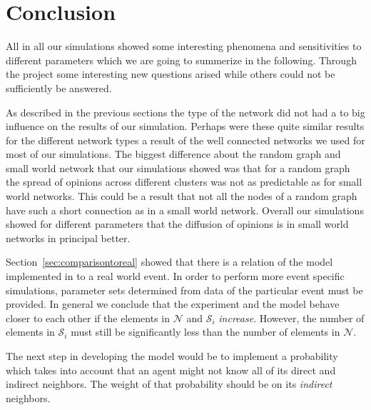 
\section{Conclusion}
\label{sec:conclusion}

All in all our simulations showed some interesting phenomena and sensitivities
to different parameters which we are going to summerize in the
following. Through the project some interesting new questions arised while
others could not be sufficiently be answered.

As described in the previous sections the type of the network did not had a to
big influence on the results of our simulation. Perhaps were these quite
similar results for the different network types a result of the well connected
networks we used for most of our simulations. The biggest difference about the
random graph and small world network that our simulations showed was that for a
random graph the spread of opinions across different clusters was not as
predictable as for small world networks. This could be a result that not all
the nodes of a random graph have such a short connection as in a small world
network. Overall our simulations showed for different parameters that the
diffusion of opinions is in small world networks in principal better.

Section~\ref{sec:comparisontoreal} showed that there is a relation of the model
implemented in \matlab to a real world event.  In order to perform more event
specific simulations, parameter sets determined from data of the particular
event must be provided.  In general we conclude that the experiment and the
model behave closer to each other if the elements in $\mathcal{N}$ and
$\mathcal{S}_i$ \emph{increase}.  However, the number of elements in
$\mathcal{S}_i$ must still be significantly less than the number of elements in
$\mathcal{N}$.

The next step in developing the model would be to implement a probability which
takes into account that an agent might not know all of its direct and indirect
neighbors.  The weight of that probability should be on its \emph{indirect}
neighbors.


